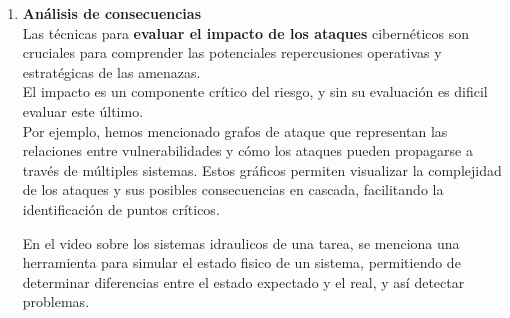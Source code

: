 \begin{enumerate}[resume]
\item \textbf{Análisis de consecuencias} \\
Las técnicas para \textbf{evaluar el impacto de los ataques} cibernéticos son cruciales para comprender las potenciales repercusiones operativas y estratégicas de las amenazas.\\
El impacto es un componente crítico del riesgo, y sin su evaluación es dificil evaluar este último.\\
Por ejemplo, hemos mencionado grafos de ataque que representan las relaciones entre vulnerabilidades y cómo los ataques pueden propagarse a través de múltiples sistemas. Estos gráficos permiten visualizar la complejidad de los ataques y sus posibles consecuencias en cascada, facilitando la identificación de puntos críticos.


En el video sobre los sistemas idraulicos de una tarea, se menciona una herramienta para simular el estado fisico de un sistema, permitiendo de determinar diferencias entre el estado expectado y el real, y así detectar problemas.
\end{enumerate}

